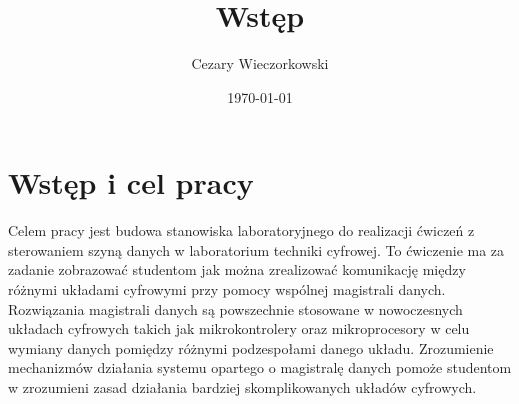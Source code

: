 \documentclass[../main.tex]{subfiles}
\author{Cezary Wieczorkowski}
\date{\today}
\title{Wstęp}
\begin{document}
\section{Wstęp i cel pracy}

Celem pracy jest budowa stanowiska laboratoryjnego do realizacji ćwiczeń z sterowaniem szyną danych w laboratorium techniki cyfrowej.
To ćwiczenie ma za zadanie zobrazować studentom jak można zrealizować komunikację między różnymi układami cyfrowymi przy pomocy
wspólnej magistrali danych. Rozwiązania magistrali danych są powszechnie stosowane w nowoczesnych układach cyfrowych takich jak mikrokontrolery oraz
mikroprocesory w celu wymiany danych pomiędzy różnymi podzespołami danego układu. Zrozumienie mechanizmów działania systemu opartego o 
magistralę danych pomoże studentom w zrozumieni zasad działania bardziej skomplikowanych układów cyfrowych.
\end{document}
